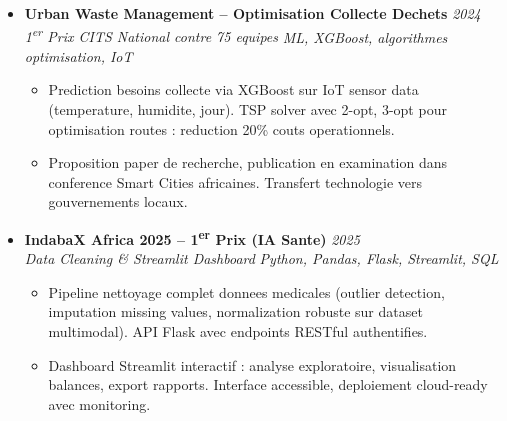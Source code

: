\documentclass[a4paper,11pt]{article}
\begin{document}
\begin{itemize}[leftmargin=*, label={-}]
\item \textbf{Urban Waste Management -- Optimisation Collecte Dechets} \hfill \textit{2024} \\
\textit{1\textsuperscript{er} Prix CITS National contre 75 equipes} \hfill \textit{ML, XGBoost, algorithmes optimisation, IoT}
\vspace{-2pt}
    \begin{itemize}[leftmargin=0.4cm, nosep, label=\tiny$\bullet$]
        \item \small{Prediction besoins collecte via XGBoost sur IoT sensor data (temperature, humidite, jour). TSP solver avec 2-opt, 3-opt pour optimisation routes : reduction 20\% couts operationnels.}
        \item \small{Proposition paper de recherche, publication en examination dans conference Smart Cities africaines. Transfert technologie vers gouvernements locaux.}
    \end{itemize}
\vspace{3pt}

\item \textbf{IndabaX Africa 2025 -- 1\textsuperscript{er} Prix (IA Sante)} \hfill \textit{2025} \\
\textit{Data Cleaning \& Streamlit Dashboard} \hfill \textit{Python, Pandas, Flask, Streamlit, SQL}
\vspace{-2pt}
    \begin{itemize}[leftmargin=0.4cm, nosep, label=\tiny$\bullet$]
        \item \small{Pipeline nettoyage complet donnees medicales (outlier detection, imputation missing values, normalization robuste sur dataset multimodal). API Flask avec endpoints RESTful authentifies.}
        \item \small{Dashboard Streamlit interactif : analyse exploratoire, visualisation balances, export rapports. Interface accessible, deploiement cloud-ready avec monitoring.}
    \end{itemize}
\vspace{3pt}

\end{itemize}
\end{document}
